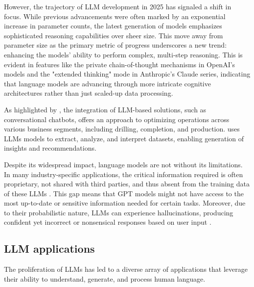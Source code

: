         However, the trajectory of LLM development in 2025 has signaled a shift in focus. While previous advancements were often marked by an exponential increase in parameter counts, the latest generation of models emphasizes sophisticated reasoning capabilities over sheer size. 
        This move away from parameter size as the primary metric of progress underscores a new trend: enhancing the models' ability to perform complex, multi-step reasoning. 
        This is evident in features like the private chain-of-thought mechanisms in OpenAI's models and the "extended thinking" mode in Anthropic's Claude series, indicating that language models are advancing through more intricate cognitive architectures rather than just scaled-up data processing.

        As highlighted by \citet{Singh2023}, the integration of LLM-based solutions, such as conversational chatbots, offers an approach to optimizing operations across various business segments, including drilling, completion, and production.
        \citet{Singh2023} uses LLMs models to extract, analyze, and interpret datasets, enabling generation of insights and recommendations. 

        Despite its widespread impact, language models are not without its limitations. 
        In many industry-specific applications, the critical information required is often proprietary, not shared with third parties, and thus absent from the training data of these LLMs \citep{Mosser2024}. 
        This gap means that GPT models might not have access to the most up-to-date or sensitive information needed for certain tasks. 
        Moreover, due to their probabilistic nature, LLMs can experience hallucinations, producing confident yet incorrect or nonsensical responses based on user input \citep{OpenAI2023}. 
    
    
        \subsection{LLM applications}


            The proliferation of LLMs has led to a diverse array of applications that leverage their ability to understand, generate, and process human language.

